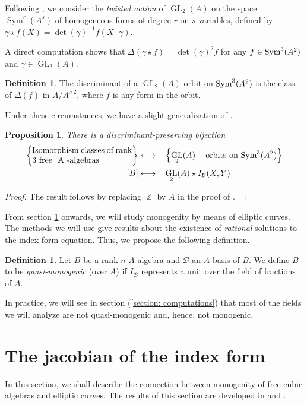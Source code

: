 \documentclass[oneside]{amsart}
\newcommand{\syma}{\textnormal{Sym}^3(A^2)}
\DeclareMathOperator{\ZZ}{\mathbb{Z}}
\DeclareMathOperator{\gl}{GL}
\DeclareMathOperator{\sym}{Sym}
\newtheorem{proposition}[X]{Proposition}
\theoremstyle{definition}
\newtheorem{definition}[X]{Definition}
\begin{document}
Following  \cite{Bhargava}, we consider the \textit{twisted action}   
of $\gl_2(A)$ on the space $\sym^r(A^s)$  of homogeneous forms of degree $r$ on $s$ variables,
defined by $\gamma\star f(X) = \det(\gamma)^{-1}f(X\cdot\gamma)$.

A direct computation shows that $\Delta(\gamma\star f) = \det(\gamma)^2 f$ for any $f \in \syma$ and $\gamma \in \gl_2(A)$. 
\begin{definition}
    The \textnormal{discriminant} of a $\gl_2(A)$-orbit on $\syma$ is the class of $\Delta(f)$ in $A/A^{\times 2}$, where $f$ is any form in the orbit.
\end{definition}
Under these circumstances, we have a slight generalization of {\cite[Prop. 4.2]{GanGrossSavin}}.
\begin{proposition}
    \label{proposition: GGS bijection}
    There is a discriminant-preserving bijection 
    \begin{alignat*}{4}
        \left\{\parbox{12em}{\textnormal{Isomorphism classes of rank 3            free } A \textnormal{-algebras}}\right\}&\longleftrightarrow&&\left\{\gl_2(A)-\textnormal{orbits on }\syma\right\}\\
        [B]&\longleftrightarrow&&\gl_2(A)\star I_{\mathcal{B}}(X,Y)
    \end{alignat*}
\end{proposition}
\begin{proof}
    The result follows by replacing $\ZZ$ by $A$ in the proof of \cite[Prop. 4.2]{GanGrossSavin}.
\end{proof}

From section \ref{section: jacobian of the index form} onwards, we will study monogenity by means of elliptic curves. The methods we will use give results about the existence of \textit{rational} solutions to the index form equation. Thus, we propose the following definition.

\begin{definition}
    Let $B$ be a rank $n$ $A$-algebra and $\mathcal{B}$ an $A$-basis of $B$. We define $B$ to be \textit{quasi-monogenic} (over $A$) if $I_{\mathcal{B}}$ represents a unit over the field of fractions of $A$.
\end{definition}

In practice, we will see in section (\ref{section: computations}) that most of the fields we will analyze are not quasi-monogenic and, hence, not monogenic. 

\section{The jacobian of the index form}
\label{section: jacobian of the index form}
In this section, we shall describe the connection between monogenity of free cubic algebras and elliptic curves. The results of this section are developed in \cite{Bhargava} and \cite{Bhargava_2019}.
\end{document}
